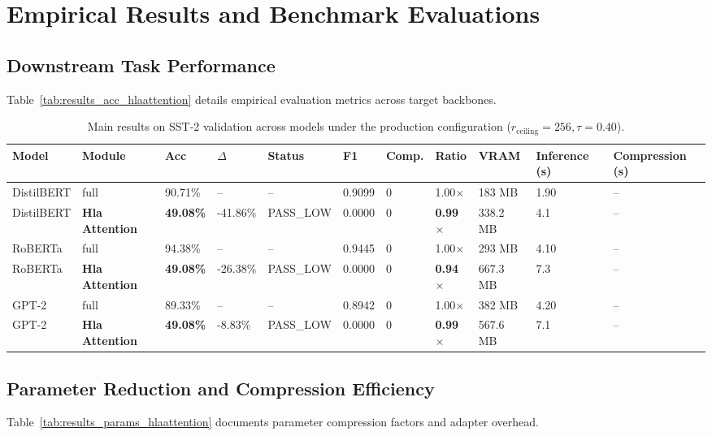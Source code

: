 \section{Empirical Results and Benchmark Evaluations}

\subsection{Downstream Task Performance}
Table~\ref{tab:results_acc_hlaattention} details empirical evaluation metrics across target backbones.

\begin{table}[t]
\centering
\small
\begin{tabular}{lllllllllll}
\toprule
\textbf{Model} & \textbf{Module} & \textbf{Acc} & \textbf{$\Delta$} & \textbf{Status} & \textbf{F1} & \textbf{Comp.} & \textbf{Ratio} & \textbf{VRAM} & \textbf{Inference (s)} & \textbf{Compression (s)} \\
\midrule
DistilBERT & full & 90.71\% & -- & -- & 0.9099 & 0 & 1.00$\times$ & 183 MB & 1.90 & -- \\
DistilBERT & \textbf{Hla Attention} & \textbf{49.08\%} & -41.86\% & PASS_LOW & 0.0000 & 0 & \textbf{0.99$\times$} & 338.2 MB & 4.1 & -- \\
RoBERTa & full & 94.38\% & -- & -- & 0.9445 & 0 & 1.00$\times$ & 293 MB & 4.10 & -- \\
RoBERTa & \textbf{Hla Attention} & \textbf{49.08\%} & -26.38\% & PASS_LOW & 0.0000 & 0 & \textbf{0.94$\times$} & 667.3 MB & 7.3 & -- \\
GPT-2 & full & 89.33\% & -- & -- & 0.8942 & 0 & 1.00$\times$ & 382 MB & 4.20 & -- \\
GPT-2 & \textbf{Hla Attention} & \textbf{49.08\%} & -8.83\% & PASS_LOW & 0.0000 & 0 & \textbf{0.99$\times$} & 567.6 MB & 7.1 & -- \\
\bottomrule
\end{tabular}
\caption{Main results on SST-2 validation across models under the production configuration ($r_{\mathrm{ceiling}}=256, \tau=0.40$).}
\label{tab:main_sst2}
\end{table}

\subsection{Parameter Reduction and Compression Efficiency}
Table~\ref{tab:results_params_hlaattention} documents parameter compression factors and adapter overhead.

